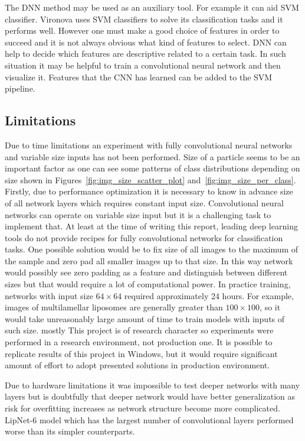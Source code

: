 \documentclass[a4paper, 11pt, table]{article}
\begin{document}
The DNN method may be used as an auxiliary tool. For example it can aid SVM classifier. Vironova uses SVM classifiers to solve its classification tasks and it performs well. However one must make a good choice of features in order to succeed and it is not always obvious what kind of features to select. DNN can help to decide which features are descriptive related to a certain task. In such situation it may be helpful to train a convolutional neural network and then visualize it. Features that the CNN has learned can be added to the SVM pipeline. 


\subsection{Limitations}

Due to time limitations an experiment with fully convolutional neural networks and variable size inputs has not been performed. Size of a particle seems to be an important factor as one can see some patterns of class distributions depending on size shown in Figures~\ref{fig:img_size_scatter_plot} and~\ref{fig:img_size_per_class}. Firstly, due to performance optimization it is necessary to know in advance size of all network layers which requires constant input size. Convolutional neural networks can operate on variable size input but it is a challenging task to implement that. At least at the time of writing this report, leading deep learning tools do not provide recipes for fully convolutional networks for classification tasks. One possible solution would be to fix size of all images to the maximum of the sample and zero pad all smaller images up to that size. In this way network would possibly see zero padding as a feature and distinguish between different sizes but that would require a lot of computational power. In practice training, networks with input size $64 \times 64$ required approximately 24 hours. For example, images of multilamellar liposomes are generally greater than $100 \times 100$, so it would take unreasonably large amount of time to train models with inputs of such size. 
mostly
This project is of research character so experiments were performed in a research environment, not production one. It is possible to replicate results of this project in Windows, but it would require significant amount of effort to adopt presented solutions in production environment.

Due to hardware limitations it was impossible to test deeper networks with many layers but is doubtfully that deeper network would have better generalization as risk for overfitting increases as network structure become more complicated. LipNet-6 model which has the largest number of convolutional layers performed worse than its simpler counterparts.
\end{document}

